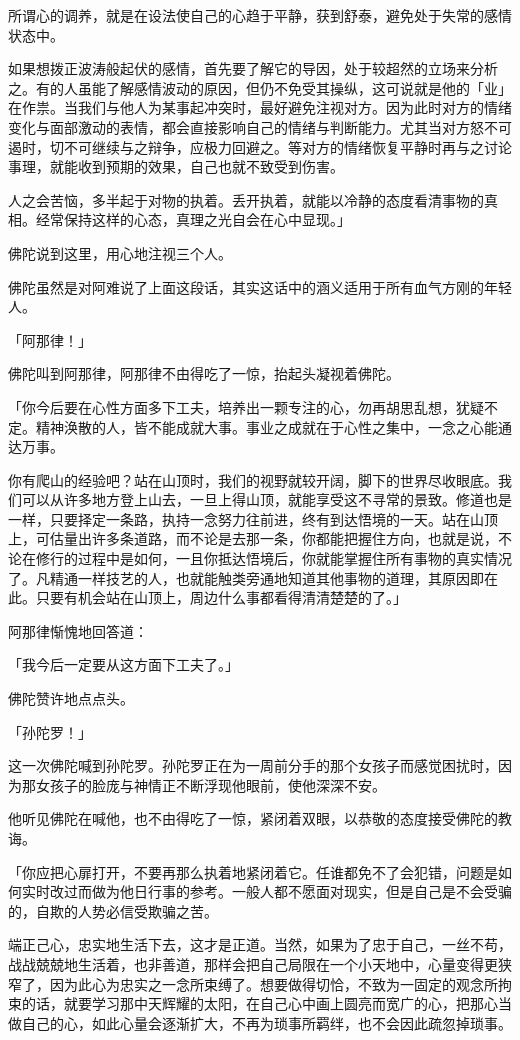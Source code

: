\documentclass[twoside,openany]{book}
\begin{document}
所谓心的调养，就是在设法使自己的心趋于平静，获到舒泰，避免处于失常的感情状态中。

如果想拨正波涛般起伏的感情，首先要了解它的导因，处于较超然的立场来分析之。有的人虽能了解感情波动的原因，但仍不免受其操纵，这可说就是他的「业」在作祟。当我们与他人为某事起冲突时，最好避免注视对方。因为此时对方的情绪变化与面部激动的表情，都会直接影响自己的情绪与判断能力。尤其当对方怒不可遏时，切不可继续与之辩争，应极力回避之。等对方的情绪恢复平静时再与之讨论事理，就能收到预期的效果，自己也就不致受到伤害。

人之会苦恼，多半起于对物的执着。丢开执着，就能以冷静的态度看清事物的真相。经常保持这样的心态，真理之光自会在心中显现。」

佛陀说到这里，用心地注视三个人。

佛陀虽然是对阿难说了上面这段话，其实这话中的涵义适用于所有血气方刚的年轻人。

「阿那律！」

佛陀叫到阿那律，阿那律不由得吃了一惊，抬起头凝视着佛陀。

「你今后要在心性方面多下工夫，培养出一颗专注的心，勿再胡思乱想，犹疑不定。精神涣散的人，皆不能成就大事。事业之成就在于心性之集中，一念之心能通达万事。

你有爬山的经验吧？站在山顶时，我们的视野就较开阔，脚下的世界尽收眼底。我们可以从许多地方登上山去，一旦上得山顶，就能享受这不寻常的景致。修道也是一样，只要择定一条路，执持一念努力往前进，终有到达悟境的一天。站在山顶上，可估量出许多条道路，而不论是去那一条，你都能把握住方向，也就是说，不论在修行的过程中是如何，一且你抵达悟境后，你就能掌握住所有事物的真实情况了。凡精通一样技艺的人，也就能触类旁通地知道其他事物的道理，其原因即在此。只要有机会站在山顶上，周边什么事都看得清清楚楚的了。」

阿那律惭愧地回答道：

「我今后一定要从这方面下工夫了。」

佛陀赞许地点点头。

「孙陀罗！」

这一次佛陀喊到孙陀罗。孙陀罗正在为一周前分手的那个女孩子而感觉困扰时，因为那女孩子的脸庞与神情正不断浮现他眼前，使他深深不安。

他听见佛陀在喊他，也不由得吃了一惊，紧闭着双眼，以恭敬的态度接受佛陀的教诲。

「你应把心扉打开，不要再那么执着地紧闭着它。任谁都免不了会犯错，问题是如何实时改过而做为他日行事的参考。一般人都不愿面对现实，但是自己是不会受骗的，自欺的人势必信受欺骗之苦。

端正己心，忠实地生活下去，这才是正道。当然，如果为了忠于自己，一丝不苟，战战兢兢地生活着，也非善道，那样会把自己局限在一个小天地中，心量变得更狭窄了，因为此心为忠实之一念所束缚了。想要做得切恰，不致为一固定的观念所拘束的话，就要学习那中天辉耀的太阳，在自己心中画上圆亮而宽广的心，把那心当做自己的心，如此心量会逐渐扩大，不再为琐事所羁绊，也不会因此疏忽掉琐事。
\end{document}
